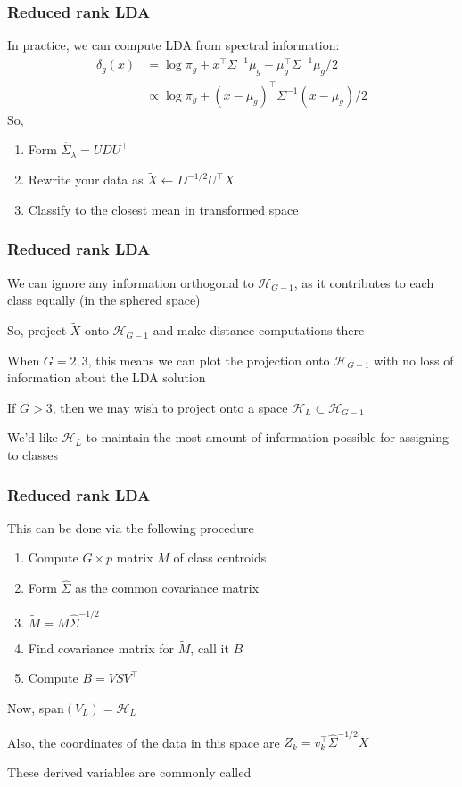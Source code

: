 \documentclass[12pt]{beamer}
\begin{document}
\begin{frame}
\frametitle{Reduced rank LDA}
In practice, we can compute LDA from spectral information:
\begin{align*}
\delta_g(x) 
& = 
\log \pi_g + x^{\top} \Sigma^{-1}\mu_g  - \mu_{g}^{\top} \Sigma^{-1} \mu_g /2 \\
&\propto
\log \pi_g + (x - \mu_g)^{\top} \Sigma^{-1}(x - \mu_g)/2 
\end{align*}
So,
\begin{enumerate}
\item {} Form $\hat{\Sigma}_{\lambda} = U D U^{\top}$
\item {} Rewrite your data as $\tilde{X} \leftarrow D^{-1/2} U^{\top} X$
\item {}  Classify to the closest mean in transformed space

\end{enumerate}
\end{frame}

\begin{frame}
\frametitle{Reduced rank LDA}
We can ignore any information orthogonal to $\mathcal{H}_{G-1}$, as it contributes to each
class equally (in the sphered space)

\vsp
So, project $\tilde{X}$ onto $\mathcal{H}_{G-1}$ and make distance computations there

\vsp
When $G = 2,3$, this means we can plot the projection onto $\mathcal{H}_{G-1}$ with
no loss of information about the LDA solution

\vsp
If $G > 3$, then we may wish to project onto a  space $\mathcal{H}_{L} \subset \mathcal{H}_{G-1}$

\vsp
We'd like $\mathcal{H}_L$ to maintain the most amount of information possible for assigning to classes
\end{frame}


\begin{frame}
\frametitle{Reduced rank LDA}
This can be done via the following procedure
\begin{enumerate}
\item {} Compute $G \times p$ matrix $M$ of class centroids
\item {} Form $\hat\Sigma$ as the common covariance matrix
\item {} $\tilde{M} = M \hat\Sigma^{-1/2}$
\item {} Find covariance matrix for $\tilde{M}$, call it $B$
\item {} Compute $B = V S V^{\top}$
\end{enumerate}
\vsp

Now, span$(V_L) = \mathcal{H}_L$

\vsp
Also, the coordinates of the data in this space are $Z_k = v_k^{\top} \hat\Sigma^{-1/2}X$

\vsp
These derived variables are commonly called 
\end{frame}
\end{document}
